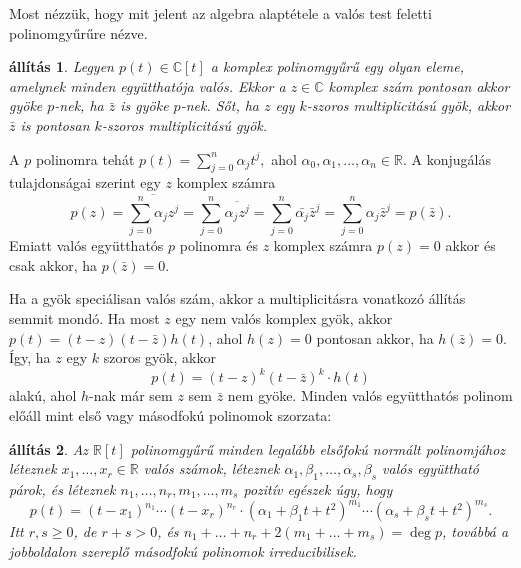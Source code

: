 \documentclass[9pt, a4paper, showtrims]{memoir}
\makeatletter
\renewenvironment{proof}[1][\proofname]
    {\par\pushQED{\qed}%
    \normalfont \topsep6\p@\@plus6\p@\relax
    \trivlist
    \item[\hskip\labelsep
        \itshape
    #1\@addpunct{:}]\ignorespaces}
    {\popQED\endtrivlist\@endpefalse}
\theoremstyle{plain}
\newtheorem{proposition}{állítás}[chapter]
\theoremstyle{remark}
\theoremstyle{definition}
\makeatother
\begin{document}
Most nézzük, hogy mit jelent az algebra alaptétele a valós test feletti polinomgyűrűre nézve.
\begin{proposition}
	Legyen $p\left( t \right)\in\mathbb{C}[t]$ a komplex polinomgyűrű egy olyan eleme,
	amelynek minden együtthatója valós.
	Ekkor a $z\in \mathbb{C}$ komplex szám pontosan akkor gyöke $p$-nek,
	ha $\bar{z}$ is gyöke $p$-nek.
	Sőt, ha $z$ egy $k$-szoros multiplicitású gyök,
	akkor $\bar{z}$ is pontosan $k$-szoros multiplicitású gyök.
\end{proposition}
\begin{proof}
	A $p$ polinomra tehát
	\begin{math}
		p\left( t \right)
		=
		\sum_{j=0}^n\alpha_jt^j,
	\end{math}
	ahol $\alpha_0,\alpha_1,\ldots,\alpha_n\in\mathbb{R}$.
	A konjugálás tulajdonságai szerint egy $z$ komplex számra
	\[
		p\left( z \right)=
		\overline{
			\sum_{j=0}^n\alpha_jz^j
		}
		=
		\sum_{j=0}^n\overline{\alpha_jz^j}
		=
		\sum_{j=0}^n\bar{\alpha_j}\bar{z}^j
		=
		\sum_{j=0}^n\alpha_j\bar{z}^j
		=
		p\left(\bar{z} \right).
	\]
	Emiatt valós együtthatós $p$ polinomra és $z$ komplex számra
	$p\left( z \right)=0$ akkor és csak akkor, ha $p\left( \bar{z} \right)=0.$

	Ha a gyök speciálisan valós szám, akkor a multiplicitásra vonatkozó állítás semmit mondó.
	Ha most $z$ egy nem valós komplex gyök,
	akkor $p(t)=\left( t-z \right)\left( t-\bar{z} \right)h\left( t \right)$, ahol
	$h\left( z \right)=0$ pontosan akkor, ha $h\left( \bar{z} \right)=0$.
	Így, ha $z$ egy $k$ szoros gyök,
	akkor
	\[
		p\left( t \right)=\left( t-z \right)^{k}\left( t-\bar{z} \right)^{k}\cdot h\left( t \right)
	\]
	alakú, ahol $h$-nak már sem $z$ sem $\bar{z}$ nem gyöke.
\end{proof}
Minden valós együtthatós polinom előáll mint első vagy másodfokú polinomok szorzata:
\begin{proposition}\label{pr:RealPolFact}
	Az $\mathbb{R}[t]$ polinomgyűrű minden legalább elsőfokú normált polinomjához
	léteznek $x_1,\ldots,x_r\in\mathbb{R}$ valós számok,
	léteznek $\alpha_1,\beta_1,\ldots,\alpha_s,\beta_s$ valós együttható párok,
	és léteznek
	$n_1,\ldots,n_r, m_1,\ldots,m_s$ pozitív egészek úgy, hogy
	\[
		p\left( t \right)
		=
		\left( t-x_1 \right)^{n_1}
		\cdots
		\left( t-x_r \right)^{n_r}
		\cdot
		\left(\alpha_1 + \beta_1t +t^2\right)^{m_1}
		\cdots
		\left(\alpha_s + \beta_st +t^2\right)^{m_s}.
	\]
	Itt $r,s\geq 0$, de $r+s>0$, és $n_1+\dots+n_r+2\left( m_1+\dots+m_s \right)=\deg p$,
	továbbá a jobboldalon szereplő másodfokú polinomok irreducibilisek.
\end{proposition}
\end{document}
